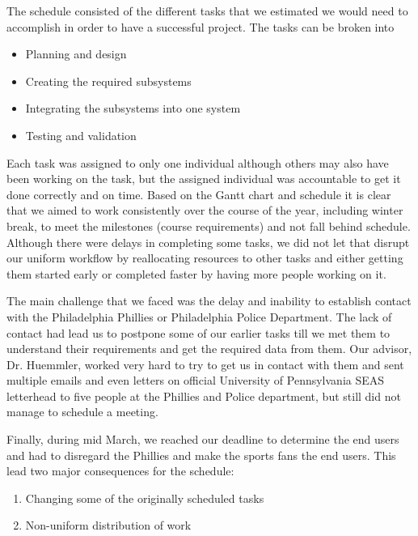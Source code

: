 The schedule consisted of the different tasks that we estimated we
would need to accomplish in order to have a successful project. The
tasks can be broken into

\begin{itemize}
  \item Planning and design
  \item Creating the required subsystems
  \item Integrating the subsystems into one system
  \item Testing and validation
\end{itemize}

Each task was assigned to only one individual although others may also
have been working on the task, but the assigned individual was
accountable to get it done correctly and on time. Based on the Gantt
chart and schedule it is clear that we aimed to work consistently over
the course of the year, including winter break, to meet the milestones
(course requirements) and not fall behind schedule. Although there
were delays in completing some tasks, we did not let that disrupt our
uniform workflow by reallocating resources to other tasks and either
getting them started early or completed faster by having more people
working on it.

The main challenge that we faced was the delay and inability to
establish contact with the Philadelphia Phillies or Philadelphia
Police Department. The lack of contact had lead us to postpone some of
our earlier tasks till we met them to understand their requirements
and get the required data from them. Our advisor, Dr. Huemmler, worked
very hard to try to get us in contact with them and sent multiple
emails and even letters on official University of Pennsylvania SEAS
letterhead to five people at the Phillies and Police department, but
still did not manage to schedule a meeting.

Finally, during mid March, we reached our deadline to determine the
end users and had to disregard the Phillies and make the sports fans
the end users. This lead two major consequences for the schedule:

\begin{enumerate}
  \item Changing some of the originally scheduled tasks
  \item Non-uniform distribution of work
\end{enumerate}

